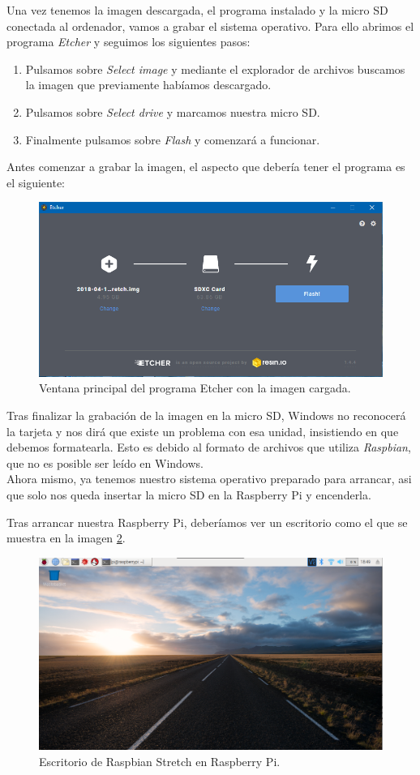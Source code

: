 Una vez tenemos la imagen descargada, el programa instalado y la micro SD conectada al ordenador, vamos a grabar el sistema operativo.
Para ello abrimos el programa \textit{Etcher} y seguimos los siguientes pasos:
\begin{enumerate}
	\item Pulsamos sobre \textit{Select image} y mediante el explorador de archivos buscamos la imagen que previamente habíamos descargado.
	\item Pulsamos sobre \textit{Select drive} y marcamos nuestra micro SD.
	\item Finalmente pulsamos sobre \textit{Flash} y comenzará a funcionar.
\end{enumerate}

Antes comenzar a grabar la imagen, el aspecto que debería tener el programa es el siguiente:
\begin{figure}[h!]
	\centering
	\includegraphics[width=0.7\linewidth]{img/etcher}
	\caption{Ventana principal del programa Etcher con la imagen cargada.}
	\label{fig:etcher}
\end{figure}

Tras finalizar la grabación de la imagen en la micro SD, Windows no reconocerá la tarjeta y nos dirá que existe un problema con esa unidad, insistiendo en que debemos formatearla. Esto es debido al formato de archivos que utiliza \textit{Raspbian}, que no es posible ser leído en Windows.\\
Ahora mismo, ya tenemos nuestro sistema operativo preparado para arrancar, asi que solo nos queda insertar la micro SD en la Raspberry Pi y encenderla.

Tras arrancar nuestra Raspberry Pi, deberíamos ver un escritorio como el que se muestra en la imagen \ref{fig:escritorio}.

\begin{figure}[h!]
	\centering
	\includegraphics[width=0.8\linewidth]{img/escritorio}
	\caption{Escritorio de Raspbian Stretch en Raspberry Pi.}
	\label{fig:escritorio}
\end{figure}

